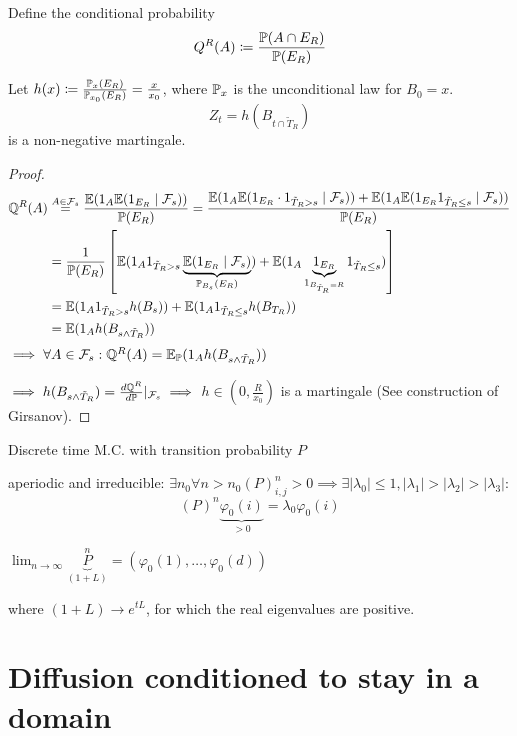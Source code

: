 Define the conditional probability 
\[Q^R(A)\coloneqq \frac{\mathbb{P}(A\cap E_R)}{\mathbb{P}(E_R)}\]

\begin{lemma}\label{lem:2.8}
    Let $h(x)\coloneqq \frac{\mathbb{P}_x(E_R)}{\mathbb{P}_{x_0}(E_R)}=\frac{x}{x_0}$,
    where $\mathbb{P}_x$ is the unconditional law for $B_0=x$.    
    \[Z_t=h(B_{t\cap \tilde{T}_R})\]
    is a non-negative martingale.
\end{lemma}

\begin{proof}
    \begin{align*}
        \mathbb{Q}^R(A)&\stackrel{A\in\mathcal{F}_s}{=}\frac{\mathbb{E}(1_A\mathbb{E}(1_{E_R}\mid \mathcal{F}_s))}{\mathbb{P}(E_R)}=\frac{\mathbb{E}(1_A\mathbb{E}(1_{E_R}\cdot 1_{\tilde{T}_R>s}\mid \mathcal{F}_s))+\mathbb{E}(1_A\mathbb{E}(1_{E_R}1_{\tilde{T}_R\leq s}\mid\mathcal{F}_s))}{\mathbb{P}(E_R)}\\
        &=\frac{1}{\mathbb{P}(E_R)}\left[\mathbb{E}(1_A1_{\tilde{T}_R>s}\underbrace{\mathbb{E}(1_{E_R}\mid\mathcal{F}_s)}_{\mathbb{P}_{B_s}(E_R)})+\mathbb{E}(1_A\underbrace{1_{E_R}}_{1_{B_{\tilde{T}_R}=R}}1_{\tilde{T}_R\leq s}) \right]\\
        &=\mathbb{E}(1_A1_{\tilde{T}_R>s}h(B_s))+\mathbb{E}(1_A1_{\tilde{T}_R\leq s}h(B_{T_R}))\\
        &=\mathbb{E}(1_A h(B_{s\land \tilde{T}_R}))
    \end{align*}
    $\implies\forall A\in\mathcal{F}_s: \mathbb{Q}^R(A)=\mathbb{E}_{\mathbb{P}}(1_Ah(B_{s\land \tilde{T}_R}))$

    $\implies h(B_{s\land \tilde{T}_R})=\frac{d\mathbb{Q}^R}{d\mathbb{P}}\vert_{\mathcal{F}_s} \implies$ $h\in(0,\frac{R}{x_0})$ is a martingale (See construction of Girsanov).  
\end{proof}



\begin{aexample}
    Discrete time M.C. with transition probability $P$

    aperiodic and irreducible: $\exists n_0\forall n>n_0 (P)_{i,j}^n>0\implies \exists |\lambda_0|\leq 1,|\lambda_1|>|\lambda_2|>|\lambda_3|$:\[(P)^n\underbrace{\varphi_0(i)}_{>0}=\lambda_0\varphi_0(i)\]

    $\lim_{n\to\infty} \underbrace{P}_{(1+L)}^n = (\varphi_0(1),\dots,\varphi_0(d))$

    where $(1+L)\to e^{tL}$, for which the real eigenvalues are positive.

\end{aexample}


\section{Diffusion conditioned to stay in a domain} %


